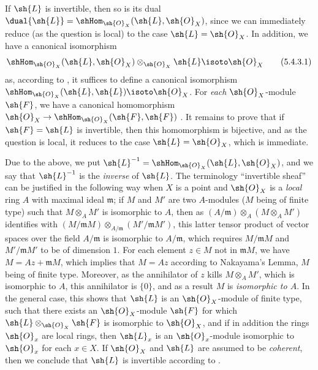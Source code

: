 \begin{env}[5.4.3]
\label{0.5.4.3}
If $\sh{L}$ is invertible, then so is its dual $\dual{\sh{L}}=\shHom_{\sh{O}_X}(\sh{L},\sh{O}_X)$, since we can immediately reduce (as the question is local) to the case $\sh{L}=\sh{O}_X$.
In addition, we have a canonical isomorphism
\[
  \shHom_{\sh{O}_X}(\sh{L},\sh{O}_X)\otimes_{\sh{O}_X}\sh{L}\isoto\sh{O}_X
  \tag{5.4.3.1}
\]
as, according to , it suffices to define a canonical isomorphism $\shHom_{\sh{O}_X}(\sh{L},\sh{L})\isoto\sh{O}_X$.
For \emph{each} $\sh{O}_X$-module $\sh{F}$, we have a canonical homomorphism $\sh{O}_X\to\shHom_{\sh{O}_X}(\sh{F},\sh{F})$ .
It remains to prove that if $\sh{F}=\sh{L}$ is invertible, then this homomorphism is bijective, and as the question is local, it reduces to the case $\sh{L}=\sh{O}_X$, which is immediate.

Due to the above, we put $\sh{L}^{-1}=\shHom_{\sh{O}_X}(\sh{L},\sh{O}_X)$, and we say that $\sh{L}^{-1}$ is the \emph{inverse} of $\sh{L}$.
The terminology ``invertible sheaf'' can be justified in the following way when $X$ is a point and $\sh{O}_X$ is a \emph{local} ring $A$ with maximal ideal $\mathfrak{m}$;
if $M$ and $M'$ are two $A$-modules ($M$ being of finite type) such that $M\otimes_A M'$ is isomorphic to $A$, then as $(A/\mathfrak{m})\otimes_A(M\otimes_A M')$ identifies with $(M/\mathfrak{m}M)\otimes_{A/\mathfrak{m}}(M'/\mathfrak{m}M')$, this latter tensor product of vector spaces over the field $A/\mathfrak{m}$ is isomorphic to $A/\mathfrak{m}$, which requires $M/\mathfrak{m}M$ and $M'/\mathfrak{m}M'$ to be of dimension $1$.
For each element $z\in M$ not in $\mathfrak{m}M$, we have $M=Az+\mathfrak{m}M$, which implies that $M=Az$ according to Nakayama's Lemma, $M$ being of finite type.
Moreover, as the annihilator of $z$ kills $M\otimes_A M'$, which is isomorphic to $A$, this annihilator is $\{0\}$, and as a result $M$ is \emph{isomorphic to $A$}.
In the general case, this shows that $\sh{L}$ is an $\sh{O}_X$-module of finite type, such that there exists an $\sh{O}_X$-module $\sh{F}$ for which $\sh{L}\otimes_{\sh{O}_X}\sh{F}$ is isomorphic to $\sh{O}_X$, and if in addition the rings $\sh{O}_x$ are local rings, then $\sh{L}_x$ is an $\sh{O}_x$-module isomorphic to $\sh{O}_x$ for each $x\in X$.
If $\sh{O}_X$ and $\sh{L}$ are assumed to be \emph{coherent}, then we conclude that $\sh{L}$ is invertible according to .
\end{env}

